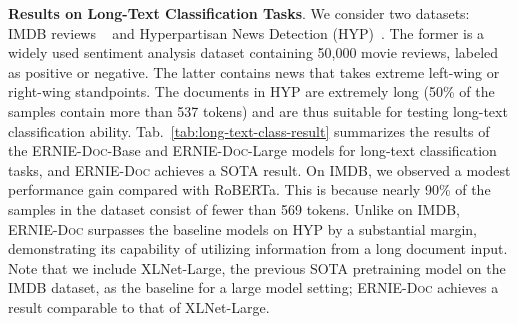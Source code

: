 \documentclass[11pt,a4paper]{article}
\newcommand{\mname}{\textsc{ERNIE-Doc}\xspace}
\begin{document}
\noindent \textbf{Results on Long-Text Classification Tasks}. We consider two datasets: IMDB reviews ~\citep{maas2011learning} and Hyperpartisan News Detection (HYP)~\citep{kiesel2019semeval}. The former is a widely used sentiment analysis dataset containing 50,000 movie reviews, labeled as positive or negative. The latter contains news that takes extreme left-wing or right-wing standpoints. The documents in HYP are extremely long (50\% of the samples contain more than 537 tokens) and are thus suitable for testing long-text classification ability. Tab.~\ref{tab:long-text-class-result} summarizes the results of the \mname-Base and \mname-Large models for long-text classification tasks, and \mname achieves a SOTA result. On IMDB, we observed a modest performance gain compared with RoBERTa. This is because nearly 90\% of the samples in the dataset consist of fewer than 569 tokens. Unlike on IMDB, \mname surpasses the baseline models on HYP by a substantial margin, demonstrating its capability of utilizing information from a long document input. Note that we include XLNet-Large, the previous SOTA pretraining model on the IMDB dataset, as the baseline for a large model setting; \mname achieves a result comparable to that of XLNet-Large. 
\end{document}
